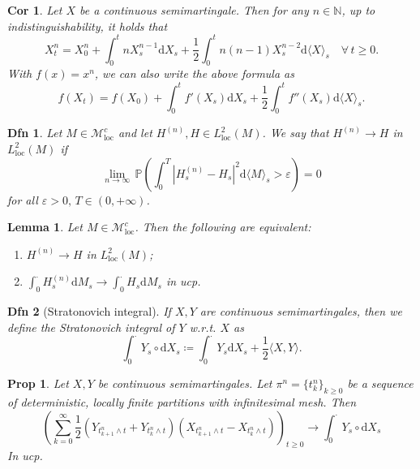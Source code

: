 \documentclass[a4paper]{article}
\theoremstyle{mytheoremstyle}
\newtheorem{definition}{Dfn}
\newtheorem{lemma}{Lemma}
\newtheorem{proposition}{Prop}
\newtheorem{corollary}{Cor}[theorem]
\newcommand{\1}{\mathds{1}}
\begin{document}
\begin{multicols*}{3}
\begin{unlabeledbox}
\begin{corollary}
  \label{cor:polynomial.ito.formula}Let $X$ be a continuous semimartingale.
  Then for any $n \in \mathbb{N}$, up to indistinguishability, it holds that
  {
  \small
  \[
    X^n_t = X^n_0 + \int_0^t n X^{n - 1}_s \mathrm{d} X_s + \frac{1}{2} \int_0^t
     n (n - 1) X^{n - 2}_s \mathrm{d} \langle X \rangle_s \quad \forall \, t
     \geqslant 0.
   \]
   }
  With $f (x) = x^n$, we can also write the above formula as
  \[ f (X_t) = f (X_0) + \int_0^t f' (X_s) \mathrm{d} X_s + \frac{1}{2} \int_0^t
     f'' (X_s) \mathrm{d} \langle X \rangle_s . \]
\end{corollary}

\begin{definition}
  Let $M \in \mathcal{M}^c_{\operatorname{loc}}$ and let $H^{(n)}, H \in
  L^2_{\operatorname{loc}} (M)$. We say that $H^{(n)} \rightarrow H$ in
  $L^2_{\operatorname{loc}} (M)$ if
  \[ \lim_{n \rightarrow \infty} \, \mathbb{P} \left( \int_0^T | H^{(n)}_s -
     H_s |^2 \mathrm{d} \langle M \rangle_s > \varepsilon \right) = 0 \]
  for all $\varepsilon > 0, \, T \in (0, + \infty)$.
\end{definition}

\begin{lemma}
  Let $M \in \mathcal{M}^c_{\operatorname{loc}}$. Then the following are equivalent:
  \begin{enumerate}
    \item $H^{(n)} \rightarrow H$ in $L^2_{\operatorname{loc}} (M)$;
    
    \item $\int_0^{\cdot} H^{(n)}_s \mathrm{d} M_s \rightarrow \int_0^{\cdot} H_s
    \mathrm{d} M_s$ in ucp.
  \end{enumerate}
\end{lemma}

\begin{definition}[Stratonovich integral]
  If $X, Y$ are continuous semimartingales, then we define the
  {\emph{Stratonovich integral}} of $Y$ w.r.t. $X$ as
  \[ \int_0^{\cdot} Y_s \circ \mathrm{d} X_s \coloneq \int_0^{\cdot} Y_s \mathrm{d} X_s
     + \frac{1}{2} \langle X, Y \rangle . \]
\end{definition}

\begin{proposition}
  \label{prop:strat.integr.properties}Let $X, Y$ be continuous
  semimartingales. Let $\pi^n = \{ t^n_k \}_{k \geqslant 0}$ be a sequence of
  deterministic, locally finite partitions with infinitesimal mesh. Then
  \[
    \left( \sum_{k = 0}^{\infty} \frac{1}{2} \left(Y_{t^n_{k + 1} \wedge t} +
     Y_{t_k^n \wedge t} \right) \left(X_{t^n_{k + 1} \wedge t} - X_{t^n_k \wedge t}\right)
     \right)_{t \ge 0} \to \int_0^{\cdot} Y_s \circ \mathrm{d} X_s
   \]
  In ucp.


\end{proposition}
\end{unlabeledbox}
\end{multicols*}
\end{document}
